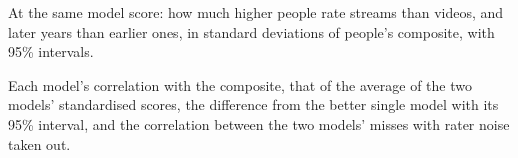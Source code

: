 \begin{table}[H]\centering
\caption{At the same model score: how much higher people rate streams than videos, and later years than earlier
ones, in standard deviations of people's composite, with 95\% intervals.}\label{tab:s2bias}

\end{table}

\begin{table}[H]\centering
\caption{Each model's correlation with the composite, that of the average of the two models' standardised
scores, the difference from the better single model with its 95\% interval, and the correlation between the two
models' misses with rater noise taken out.}\label{tab:s2both}

\end{table}
